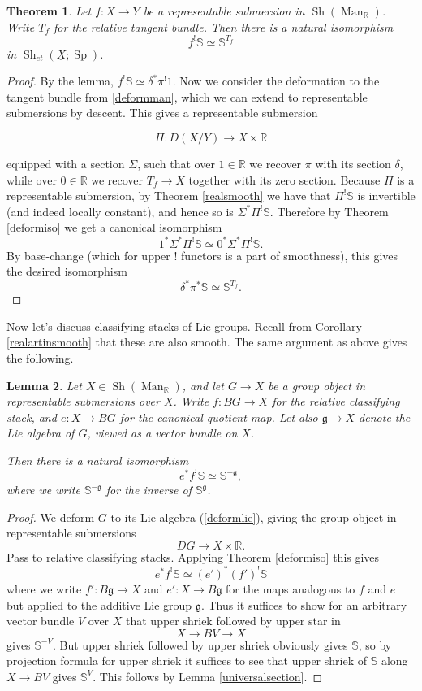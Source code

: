 \documentclass[12pt]{article}
\newtheorem{theorem}{Theorem}[section]
\newtheorem{lemma}[theorem]{Lemma}
\newcommand{\on}{\operatorname}
\newcommand{\mbb}{\mathbb}
\newcommand{\ul}{\underline}
\begin{document}
\begin{theorem}
Let $f:X \to Y$ be a representable submersion in $\on{Sh}(\on{Man}_\mbb{R})$.  Write $T_f$ for the relative tangent bundle.  Then there is a natural isomorphism
$$f^!\mbb{S} \simeq \mbb{S}^{T_f}$$
in $\on{Sh}_{et}(\ul{X};\on{Sp})$.
\end{theorem}
\begin{proof}
By the lemma, $f^!\mbb{S}\simeq \delta^\ast \pi^!1$.  Now we consider the deformation to the tangent bundle from \ref{deformman}, which we can extend to representable submersions by descent.  This gives a representable submersion

$$\Pi:D(X/Y) \rightarrow X \times \mbb{R}$$

\noindent equipped with a section $\Sigma$, such that over $1\in \mbb{R}$ we recover $\pi$ with its section $\delta$, while over $0\in \mbb{R}$ we recover $T_f \to X$ together with its zero section.  Because $\Pi$ is a representable submersion, by Theorem \ref{realsmooth} we have that $\Pi^!\mbb{S}$ is invertible (and indeed locally constant), and hence so is $\Sigma^\ast \Pi^!\mbb{S}$.  Therefore by Theorem \ref{deformiso} we get a canonical isomorphism
$$1^\ast \Sigma^\ast \Pi^!\mbb{S}\simeq 0^\ast \Sigma^\ast \Pi^!\mathbb{S}.$$
By base-change (which for upper $!$ functors is a part of smoothness), this gives the desired isomorphism
$$\delta^\ast \pi^\ast \mbb{S}\simeq \mbb{S}^{T_f}.$$\end{proof}

Now let's discuss classifying stacks of Lie groups.  Recall from Corollary \ref{realartinsmooth} that these are also smooth.  The same argument as above gives the following.

\begin{lemma}
Let $X\in\on{Sh}(\on{Man}_\mbb{R})$, and let $G\to X$ be a group object in representable submersions over $X$.  Write $f:BG\to X$ for the relative classifying stack, and $e:X\to BG$ for the canonical quotient map.  Let also $\mathfrak{g}\to X$ denote the Lie algebra of $G$, viewed as a vector bundle on $X$.

Then there is a natural isomorphism
$$e^\ast f^!\mbb{S} \simeq \mathbb{S}^{-\mathfrak{g}},$$
where we write $\mathbb{S}^{-\mathfrak{g}}$ for the inverse of $\mbb{S}^{\mathfrak{g}}$.
\end{lemma}
\begin{proof}
We deform $G$ to its Lie algebra (\ref{deformlie}), giving the group object in representable submersions
$$DG\to X\times \mbb{R}.$$
Pass to relative classifying stacks.  Applying Theorem \ref{deformiso} this gives
$$e^\ast f^!\mbb{S} \simeq (e')^\ast (f')^!\mbb{S}$$
where we write $f':B\mathfrak{g}\to X$ and $e':X\to B\mathfrak{g}$ for the maps analogous to $f$ and $e$ but applied to the additive Lie group $\mathfrak{g}$.  Thus it suffices to show for an arbitrary vector bundle $V$ over $X$ that upper shriek followed by upper star in
$$X \to BV \to X$$
gives $\mbb{S}^{-V}$.  But upper shriek followed by upper shriek obviously gives $\mbb{S}$, so by projection formula for upper shriek it suffices to see that upper shriek of $\mathbb{S}$ along $X \to BV$ gives $\mbb{S}^V$.  This follows by Lemma \ref{universalsection}.
\end{proof}
\end{document}
